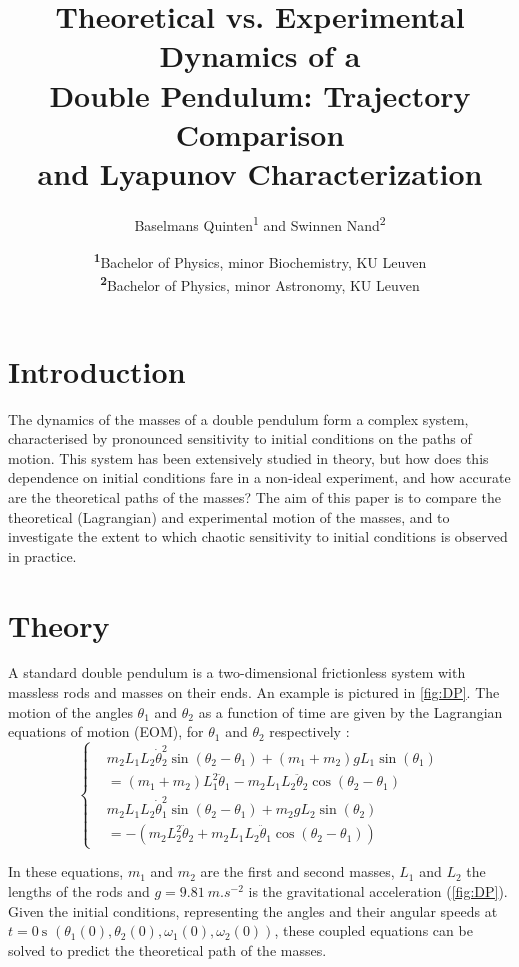 \documentclass[
a4paper, %
10pt, %
unnumberedsections, %
twoside, %
]{LTJournalArticle_JS}
\title{Theoretical vs. Experimental Dynamics of a \\ Double Pendulum: Trajectory Comparison \\ and Lyapunov Characterization} %
\author{%
	Baselmans Quinten\textsuperscript{1} and Swinnen Nand\textsuperscript{2}
}
\date{\footnotesize\textsuperscript{\textbf{1}}Bachelor of Physics, minor Biochemistry, KU Leuven\\ \textsuperscript{\textbf{2}}Bachelor of Physics, minor Astronomy, KU Leuven}
\begin{document}
\maketitle %
\section{Introduction}
The dynamics of the masses of a double pendulum form a complex system, characterised by pronounced sensitivity to initial conditions on the paths of motion. This system has been extensively studied in theory, but how does this dependence on initial conditions fare in a non-ideal experiment, and how accurate are the theoretical paths of the masses? The aim of this paper is to compare the theoretical (Lagrangian) and experimental motion of the masses, and to investigate the extent to which chaotic sensitivity to initial conditions is observed in practice.
\section{Theory}

A standard double pendulum is a two-dimensional frictionless system with massless rods and masses on their ends. An example is pictured in \autoref{fig:DP}. The motion of the angles $\theta_1$ and $\theta_2$ as a function of time are given by the Lagrangian equations of motion (EOM), for $\theta_1$ and $\theta_2$ respectively \cite{EOM}:
\begin{equation}\label{EOM}
	\left\{
	\begin{aligned}
		& m_2 L_1 L_2 \dot{\theta}_2^2 \sin(\theta_2 - \theta_1) 
		+ (m_1 + m_2) g L_1 \sin(\theta_1) \\
		&= (m_1 + m_2) L_1^2 \ddot{\theta}_1 
		- m_2 L_1 L_2 \ddot{\theta}_2 \cos(\theta_2 - \theta_1) \\
		& m_2 L_1 L_2 \dot{\theta}_1^2 \sin(\theta_2 - \theta_1) 
		+ m_2 g L_2 \sin(\theta_2) \\
		&= -\left( m_2 L_2^2 \ddot{\theta}_2 
		+ m_2 L_1 L_2 \ddot{\theta}_1 \cos(\theta_2 - \theta_1) \right)
	\end{aligned}
	\right.
\end{equation}

In these equations, $m_1$ and $m_2$ are the first and second masses, $L_1$ and $L_2$ the lengths of the rods and $g = 9.81 \ \unit{m.s^{-2}}$ is the gravitational acceleration (\autoref{fig:DP}). Given the initial conditions, representing the angles and their angular speeds at $t = 0 \ \unit{\second}$ $(\theta_1(0), \theta_2(0), \omega_1(0), \omega_2(0))$, these coupled equations can be solved to predict the theoretical path of the masses.
\end{document}
